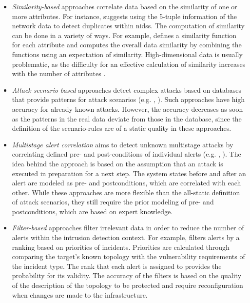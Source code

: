 \begin{itemize}
    \item \textit{Similarity-based} approaches correlate data based on the similarity of one or more attributes. For instance, \cite{goo_2001} suggests using the 5-tuple information of the network data to detect duplicates within \gls{nids}s. The computation of similarity can be done in a variety of ways. For example, \cite{goo_2001b} defines a similarity function for each attribute and computes the overall data similarity by combining the functions using an expectation of similarity. High-dimensional data is usually problematic, as the difficulty for an effective calculation of similarity increases with the number of attributes \cite{zho_2009}.
    \item \textit{Attack scenario-based} approaches detect complex attacks based on databases that provide patterns for attack scenarios (e.g. \cite{hut_2004}, \cite{jaj_2002}). Such approaches have high accuracy for already known attacks. However, the accuracy decreases as soon as the patterns in the real data deviate from those in the database, since the definition of the scenario-rules are of a static quality in these approaches.
    \item \textit{Multistage alert correlation} aims to detect unknown multistage attacks by correlating defined pre- and post-conditions of individual alerts (e.g. \cite{cup_2002}, \cite{che_2003}). The idea behind the approach is based on the assumption that an attack is executed in preparation for a next step. The system states before and after an alert are modeled as pre- and postconditions, which are correlated with each other. While these approaches are more flexible than the all-static definition of attack scenarios, they still require the prior modeling of pre- and postconditions, which are based on expert knowledge.
    \item \textit{Filter-based} approaches filter irrelevant data in order to reduce the number of alerts within the intrusion detection context. For example, \cite{goo_2002} filters alerts by a ranking based on priorities of incidents. Priorities are calculated through comparing the target's known topology with the vulnerability requirements of the incident type. The rank that each alert is assigned to provides the probability for its validity. The accuracy of the filters is based on the quality of the description of the topology to be protected and require reconfiguration when changes are made to the infrastructure.
\end{itemize}

